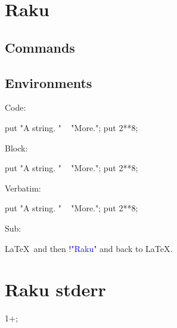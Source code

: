 \documentclass[11pt]{article}
\begin{document}
\section*{Raku}

\subsection*{Commands}




\printpythontex




\subsection*{Environments}

Code:
\begin{rakucode}
put "A string. " ~ "More.";
put 2**8;
\end{rakucode}

Block:
\begin{rakublock}
put "A string. " ~ "More.";
put 2**8;
\end{rakublock}

\printpythontex

Verbatim:
\begin{rakuverbatim}
put "A string. " ~ "More.";
put 2**8;
\end{rakuverbatim}

Sub:
\begin{rakusub}
\LaTeX\ and then \textcolor{blue}{!{"Raku"}} and back to \LaTeX.
\end{rakusub}


\section*{Raku stderr}



\stderrpythontex[][breaklines, breakafter=\\/]


\begin{rakublock}[err2][numbers=left]
1+;
\end{rakublock}
\end{document}
